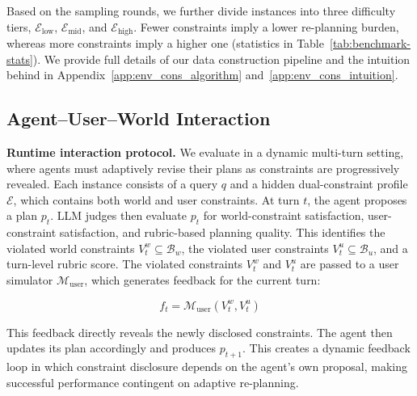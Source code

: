 Based on the sampling rounds, we further divide instances into three difficulty tiers, $\mathcal{E}_{\mathrm{low}}$, $\mathcal{E}_{\mathrm{mid}}$, and $\mathcal{E}_{\mathrm{high}}$. Fewer constraints imply a lower re-planning burden, whereas more constraints imply a higher one (statistics in Table~\ref{tab:benchmark-stats}). 
We provide full details of our data construction pipeline and the intuition behind in Appendix~\ref{app:env_cons_algorithm} and~\ref{app:env_cons_intuition}.

\subsection{Agent--User--World Interaction}
\label{sec:inference-loop}

\noindent\textbf{Runtime interaction protocol.}
We evaluate \bench{} in a dynamic multi-turn setting, where agents must adaptively revise their plans as constraints are progressively revealed.
Each instance consists of a query \(q\) and a hidden dual-constraint profile \(\mathcal{E}\), which contains both world and user constraints.
At turn \(t\), the agent proposes a plan \(p_t\).
LLM judges then evaluate \(p_t\) for world-constraint satisfaction, user-constraint satisfaction, and rubric-based planning quality.
This identifies the violated world constraints \(V_t^w \subseteq \mathcal{B}_w\), the violated user constraints \(V_t^u \subseteq \mathcal{B}_u\), and a turn-level rubric score.
The violated constraints \(V_t^w\) and \(V_t^u\) are passed to a user simulator \(\mathcal{M}_{\mathrm{user}}\), which generates feedback for the current turn:
\begin{footnotesize}
\begin{equation}
f_t = \mathcal{M}_{\mathrm{user}}(V_t^w, V_t^u)
\end{equation}
\end{footnotesize}
This feedback directly reveals the newly disclosed constraints.
The agent then updates its plan accordingly and produces \(p_{t+1}\).
This creates a dynamic feedback loop in which constraint disclosure depends on the agent's own proposal, making successful performance contingent on adaptive re-planning.

